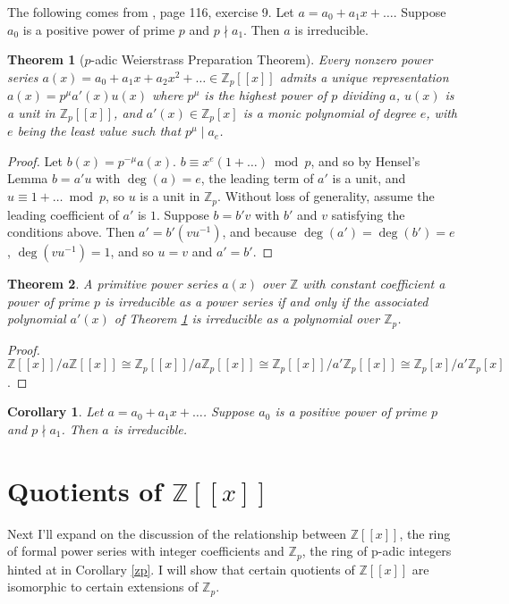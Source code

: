 \documentclass{article}
\newtheorem{theorem}{Theorem}
\newtheorem{corollary}{Corollary}
\begin{document}
The following comes from \cite{MR1697859}, page 116, exercise 9.
Let $a = a_0 + a_1x + \ldots$.  Suppose $a_0$ is a positive power of prime $p$ and $p \nmid a_1$.  Then $a$ is irreducible.
\begin{theorem}[$p$-adic Weierstrass Preparation Theorem] \label{preparation}
Every nonzero power series $a(x) = a_0 + a_1x + a_2x^2 + \ldots \in \mathbb{Z}_p[[x]]$ admits a unique representation $a(x) = p^\mu a'(x)u(x)$ where $p^\mu$ is the highest power of $p$ dividing $a$, $u(x)$ is a unit in $\mathbb{Z}_p[[x]]$, and $a'(x) \in \mathbb{Z}_p[x]$ is a monic polynomial of degree $e$, with $e$ being the least value such that $p^\mu \mid a_e$.
\end{theorem}
\begin{proof}
Let $b(x) = p^{-\mu}a(x)$.  $b \equiv x^e(1 + \ldots) \bmod p$, and so by Hensel's Lemma $b = a'u$ with $\deg(a) = e$, the leading term of $a'$ is a unit, and $u \equiv 1 + \ldots \bmod p$, so $u$ is a unit in $\mathbb{Z}_p$.  Without loss of generality, assume the leading coefficient of $a'$ is $1$.  Suppose $b = b'v$ with $b'$ and $v$ satisfying the conditions above.  Then $a' = b'(vu^{-1})$, and because $\deg(a') = \deg(b') = e$,
$\deg(vu^{-1}) = 1$, and so $u = v$ and $a' = b'$.
\end{proof}

\begin{theorem}
A primitive power series $a(x)$ over $\mathbb{Z}$ with constant coefficient a power of prime $p$ is irreducible as a power series if and only if the associated polynomial $a'(x)$ of Theorem \ref{preparation} is irreducible as a polynomial over $\mathbb{Z}_p$.
\end{theorem}
\begin{proof}
$\mathbb{Z}[[x]]/a\mathbb{Z}[[x]] \cong \mathbb{Z}_p[[x]]/a\mathbb{Z}_p[[x]] \cong \mathbb{Z}_p[[x]]/ a'\mathbb{Z}_p[[x]] \cong \mathbb{Z}_p[x]/a'\mathbb{Z}_p[x]$.
\end{proof}

\begin{corollary}
Let $a = a_0 + a_1x + \ldots$.  Suppose $a_0$ is a positive power of prime $p$ and $p \nmid a_1$.  Then $a$ is irreducible.
\end{corollary}

\section{Quotients of $\mathbb{Z}[[x]]$}

Next I'll expand on the discussion of the relationship between $\mathbb{Z}[[x]]$, the ring of formal power series with integer coefficients and $\mathbb{Z}_p$, the ring of p-adic integers hinted at in Corollary \ref{zp}.  I will show that certain quotients of $\mathbb{Z}[[x]]$ are isomorphic to certain extensions of $\mathbb{Z}_p$.
\end{document}
